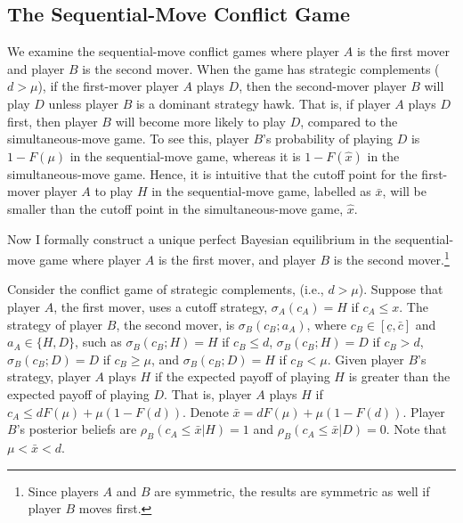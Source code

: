 \documentclass[12pt,english]{article}
\begin{document}
\subsection{The Sequential-Move Conflict Game }
We examine the sequential-move conflict games where player $A$ is the first mover and player $B$ is the second mover. When the game has strategic complements ($d>\mu$), if the first-mover player $A$ plays $D$, then the second-mover player $B$ will play $D$ unless player $B$ is a dominant strategy hawk. That is, if player $A$ plays $D$ first, then player $B$ will become more likely to play $D$, compared to the simultaneous-move game. To see this, player $B$'s probability of playing $D$ is $1-F(\mu)$ in the sequential-move game, whereas it is $1-F(\hat{x})$ in the simultaneous-move game. Hence, it is intuitive that the cutoff point for the first-mover player $A$ to play $H$ in the sequential-move game, labelled as $\bar{x}$, will be smaller than the cutoff point in the simultaneous-move game, $\hat{x}$.\par
Now I formally construct a unique perfect Bayesian equilibrium in the sequential-move game where player $A$ is the first mover, and player $B$ is the second mover.\footnote{Since players $A$ and $B$ are symmetric, the results are symmetric as well if player $B$ moves first.} \par
Consider the conflict game of strategic complements, (i.e., $d>\mu$). Suppose that player $A$, the first mover, uses a cutoff strategy, $\sigma_A(c_A)=H$ if $c_A \leq x$. The strategy of player $B$, the second mover, is $\sigma_B(c_B; a_A)$, where $c_B \in [\underline{c}, \bar{c}]$ and $a_A \in \{H,D\}$, such as $\sigma_B(c_B; H)=H$ if $c_B \leq d$, $\sigma_B(c_B; H)=D$ if $c_B > d$, $\sigma_B(c_B; D)=D$ if $c_B \geq \mu$, and $\sigma_B(c_B; D)=H$ if $c_B < \mu$. Given player $B$'s strategy, player $A$ plays $H$ if the expected payoff of playing $H$ is greater than the expected payoff of playing $D$. That is, player $A$ plays $H$ if $c_A \leq dF(\mu)+\mu(1-F(d))$. Denote $\bar{x}=dF(\mu)+\mu(1-F(d))$. Player $B$'s posterior beliefs are $\rho_B(c_A\leq \bar{x} |H)=1$ and $\rho_B(c_A \leq \bar{x} |D)=0$. Note that $\mu < \bar{x} < d$. \par
\end{document}
